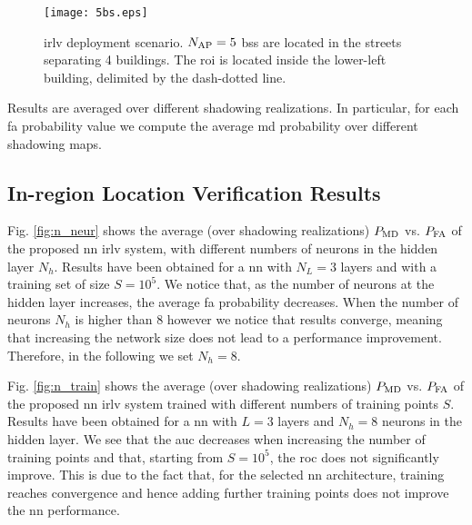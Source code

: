 \documentclass[conference,final]{IEEEtran}
\begin{document}
 \begin{figure}[h]
     \centering
     \texttt{[image: 5bs.eps]}
     \caption{\ac{irlv} deployment scenario. $N_{\rm AP}=5$ \acp{bs} are located in the streets separating 4 buildings. The \ac{roi} is located inside the lower-left building, delimited by the dash-dotted line.}
     \label{fig:5bs}
 \end{figure}
 
Results are averaged over different shadowing realizations. In particular, for each \ac{fa} probability value we compute the average \ac{md} probability over different shadowing maps.


\subsection{In-region Location Verification Results}

Fig. \ref{fig:n_neur} shows the average (over shadowing realizations) $P_{\rm MD}$ vs. $P_{\rm FA}$ of the proposed \ac{nn} \ac{irlv} system,  with different numbers of neurons in the hidden layer $N_h$. Results have been obtained for a \ac{nn} with $N_L=3$ layers and with a training set of size $S= 10^5$. We notice that, as the number of neurons at the hidden layer increases, the average \ac{fa} probability decreases. When the number of neurons $N_h$ is higher than $8$ however we notice that results converge, meaning that increasing the network size does not lead to a performance improvement. Therefore, in the following we set $N_h=8$.

Fig. \ref{fig:n_train} shows the average (over shadowing realizations) $P_{\rm MD}$ vs. $P_{\rm FA}$ of the proposed \ac{nn} \ac{irlv} system  trained with different numbers of training points $S$. Results have been obtained for a \ac{nn} with  $L=3$ layers and $N_h=8$ neurons in the hidden layer. We see that the \ac{auc} decreases when increasing the number of training points and that, starting from $S=10^5$, the \ac{roc} does not significantly improve. This is due to the fact that, for the selected \ac{nn} architecture, training reaches convergence and hence adding further  training points does not improve the \ac{nn} performance. 
\end{document}
